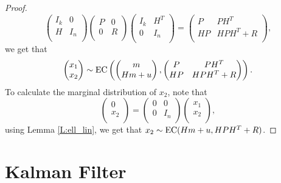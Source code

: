 \begin{proof}
\[\begin{pmatrix}
    I_k & 0   \\
    H   & I_n \\
  \end{pmatrix}
  \begin{pmatrix}
    P   & 0 \\
    0   & R \\
  \end{pmatrix}
  \begin{pmatrix}
    I_k & H^T   \\
    0   & I_n   \\
  \end{pmatrix}
  =
  \begin{pmatrix}
    P    & P H^T     \\
    HP   & HPH^T+R   \\
  \end{pmatrix},
\]
we get that 
\[
  \begin{pmatrix}
    x_1 \\
    x_2 \\
  \end{pmatrix}
  \sim
  \operatorname*{EC} 
    \left(
	  \begin{pmatrix}
        m    \\
        Hm+u \\
      \end{pmatrix},
	  \begin{pmatrix}
        P    & P H^T     \\
        HP   & HPH^T+R   \\
      \end{pmatrix}
    \right).
\]
To calculate the marginal distribution of $x_2$, note that
\[
  \begin{pmatrix}
    0   \\
    x_2 \\
  \end{pmatrix}
  =
  \begin{pmatrix}
    0 & 0    \\
    0 & I_n  \\
  \end{pmatrix}
  \begin{pmatrix}
    x_1 \\
    x_2 \\
  \end{pmatrix},
\]
using Lemma \ref{L:ell_lin}, we get that $x_2\sim \operatorname*{EC}(Hm+u, HPH^T+R)$.
\end{proof}

\section{Kalman Filter}

